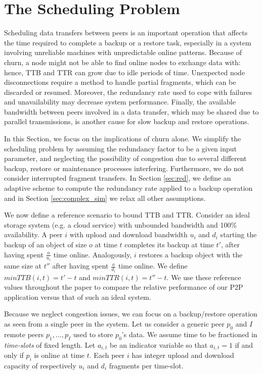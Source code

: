 \documentclass[conference,10pt]{IEEEtran}
\begin{document}
\section{The Scheduling Problem}
\label{sec:scheduling}

Scheduling data transfers between peers is an important operation that
affects the time required to complete a backup or a restore task,
especially in a system involving unreliable machines with
unpredictable online patterns. Because of churn, a node might not be
able to find online nodes to exchange data with: hence, TTB and TTR
can grow due to idle periods of time. Unexpected node disconnections
require a method to handle partial fragments, which can be discarded
or resumed.  Moreover, the redundancy rate used to cope with failures
and unavailability may decrease system performance. Finally, the
available bandwidth between peers involved in a data transfer, which
may be shared due to parallel transmissions, is another cause for slow
backup and restore operations.

In this Section, we focus on the implications of churn alone. We
simplify the scheduling problem by assuming the redundancy factor to
be a given input parameter, and neglecting the possibility of
congestion due to several different backup, restore or maintenance
processes interfering. Furthermore, we do not consider interrupted
fragment transfers. In Section \ref{sec:red}, we define an adaptive
scheme to compute the redundancy rate applied to a backup operation
and in Section \ref{sec:complex_sim} we relax all other assumptions.

We now define a reference scenario to bound TTB and TTR. Consider an
ideal storage system (e.g. a cloud service) with unbounded bandwidth
and 100\% availability. A peer $i$ with upload and download bandwidth
$u_i$ and $d_i$ starting the backup of an object of size $o$ at time
$t$ completes its backup at time $t'$, after having spent $\frac o
{u_i}$ time online. Analogously, $i$ restores a backup object with the
same size at $t''$ after having spent $\frac o {d_i}$ time online. We
define $minTTB(i, t)=t' - t$ and $minTTR(i, t)=t'' - t$. We use these
reference values throughout the paper to compare the relative
performance of our P2P application versus that of such an ideal
system.


Because we neglect congestion issues, we can focus on a backup/restore
operation as seen from a single peer in the system. Let us consider a
generic peer $p_0$ and $I$ remote peers $p_1, \ldots, p_I$ used to
store $p_0$'s data. We assume time to be fractioned
in \emph{time-slots} of fixed length. Let $a_{i,t}$ be an indicator
variable so that $a_{i,t}=1$ if and only if $p_i$ is online at time
$t$. Each peer $i$ has integer upload and download capacity of
respectively $u_i$ and $d_i$ fragments per time-slot.
\end{document}
